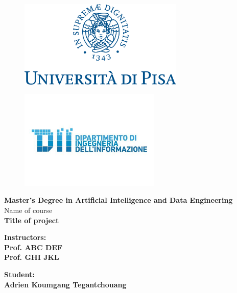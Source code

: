 
\begin{titlepage} %
\begin{figure}[t] %
    \centering\includegraphics[width=0.70\textwidth]{marchio_unipi_pant541}\label{fig:figure-first-page}
\end{figure}

\begin{figure}[t] %
    \centering\includegraphics[width=0.60\textwidth]{DII Logo}\label{fig:figure-first-page-2}
\end{figure}

\vspace{5mm}

\begin{Large}
 \begin{center}
	\textbf{Master's Degree in Artificial Intelligence and Data Engineering\\}
	\vspace{7mm}
    {\Large{Name of course}}\\
	\vspace{2mm}
	{\LARGE{\textbf{Title of project}}}
\end{center}
\end{Large}

\vspace{10mm}

\begin{minipage}[t]{0.47\textwidth}
	{\large{\textbf{Instructors:\\ Prof. ABC DEF \\ Prof. GHI JKL}}}
\end{minipage}
\hfill
\begin{minipage}[t]{0.47\textwidth}\raggedleft
	{\large{\textbf{Student: \\ Adrien Koumgang Tegantchouang}}}
\end{minipage}

\vspace{20mm}


\end{titlepage}
